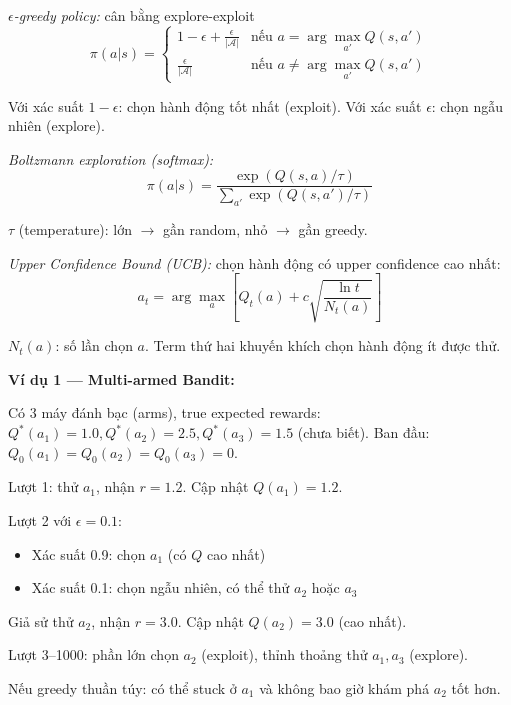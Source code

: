 \documentclass[12pt,a4paper]{article}
\begin{document}
\textit{$\epsilon$-greedy policy:} cân bằng explore-exploit
\begin{equation}
\pi(a|s) =
\begin{cases}
1 - \epsilon + \frac{\epsilon}{|\mathcal{A}|} & \text{nếu } a = \arg\max_{a'} Q(s,a') \\
\frac{\epsilon}{|\mathcal{A}|} & \text{nếu } a \neq \arg\max_{a'} Q(s,a')
\end{cases}
\end{equation}

Với xác suất $1-\epsilon$: chọn hành động tốt nhất (exploit). Với xác suất $\epsilon$: chọn ngẫu nhiên (explore).

\textit{Boltzmann exploration (softmax):}
\begin{equation}
\pi(a|s) = \frac{\exp(Q(s,a)/\tau)}{\sum_{a'} \exp(Q(s,a')/\tau)}
\end{equation}

$\tau$ (temperature): lớn $\to$ gần random, nhỏ $\to$ gần greedy.

\textit{Upper Confidence Bound (UCB):} chọn hành động có upper confidence cao nhất:
\begin{equation}
a_t = \arg\max_a \left[ Q_t(a) + c \sqrt{\frac{\ln t}{N_t(a)}} \right]
\end{equation}

$N_t(a)$: số lần chọn $a$. Term thứ hai khuyến khích chọn hành động ít được thử.

\textbf{Ví dụ 1 --- Multi-armed Bandit:}

Có 3 máy đánh bạc (arms), true expected rewards: $Q^*(a_1)=1.0, Q^*(a_2)=2.5, Q^*(a_3)=1.5$ (chưa biết). Ban đầu: $Q_0(a_1)=Q_0(a_2)=Q_0(a_3)=0$.

Lượt 1: thử $a_1$, nhận $r=1.2$. Cập nhật $Q(a_1)=1.2$.

Lượt 2 với $\epsilon=0.1$:
\begin{itemize}[leftmargin=1.5em]
    \item Xác suất 0.9: chọn $a_1$ (có $Q$ cao nhất)
    \item Xác suất 0.1: chọn ngẫu nhiên, có thể thử $a_2$ hoặc $a_3$
\end{itemize}

Giả sử thử $a_2$, nhận $r=3.0$. Cập nhật $Q(a_2)=3.0$ (cao nhất).

Lượt 3--1000: phần lớn chọn $a_2$ (exploit), thỉnh thoảng thử $a_1, a_3$ (explore).

Nếu greedy thuần túy: có thể stuck ở $a_1$ và không bao giờ khám phá $a_2$ tốt hơn.
\end{document}
